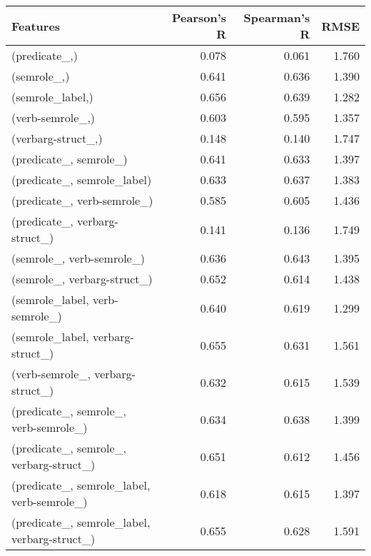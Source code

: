 \begin{tabular}{lrrr}
\toprule
                                          Features &  Pearson's R &  Spearman's R &   RMSE \\
\midrule
                                     (predicate\_,) &        0.078 &         0.061 &  1.760 \\
                                       (semrole\_,) &        0.641 &         0.636 &  1.390 \\
                                  (semrole\_label,) &        0.656 &         0.639 &  1.282 \\
                                  (verb-semrole\_,) &        0.603 &         0.595 &  1.357 \\
                                (verbarg-struct\_,) &        0.148 &         0.140 &  1.747 \\
                            (predicate\_, semrole\_) &        0.641 &         0.633 &  1.397 \\
                       (predicate\_, semrole\_label) &        0.633 &         0.637 &  1.383 \\
                       (predicate\_, verb-semrole\_) &        0.585 &         0.605 &  1.436 \\
                     (predicate\_, verbarg-struct\_) &        0.141 &         0.136 &  1.749 \\
                         (semrole\_, verb-semrole\_) &        0.636 &         0.643 &  1.395 \\
                       (semrole\_, verbarg-struct\_) &        0.652 &         0.614 &  1.438 \\
                    (semrole\_label, verb-semrole\_) &        0.640 &         0.619 &  1.299 \\
                  (semrole\_label, verbarg-struct\_) &        0.655 &         0.631 &  1.561 \\
                  (verb-semrole\_, verbarg-struct\_) &        0.632 &         0.615 &  1.539 \\
             (predicate\_, semrole\_, verb-semrole\_) &        0.634 &         0.638 &  1.399 \\
           (predicate\_, semrole\_, verbarg-struct\_) &        0.651 &         0.612 &  1.456 \\
        (predicate\_, semrole\_label, verb-semrole\_) &        0.618 &         0.615 &  1.397 \\
      (predicate\_, semrole\_label, verbarg-struct\_) &        0.655 &         0.628 &  1.591 \\

\end{tabular}
